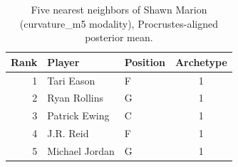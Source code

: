 \begin{table}[htbp]
  \centering\small
  \begin{tabular}{rllc}
    \toprule
    Rank & Player & Position & Archetype \\
    \midrule
    1 & Tari Eason & F & 1 \\
    2 & Ryan Rollins & G & 1 \\
    3 & Patrick Ewing & C & 1 \\
    4 & J.R. Reid & F & 1 \\
    5 & Michael Jordan & G & 1 \\
    \bottomrule
  \end{tabular}
  \caption{Five nearest neighbors of Shawn Marion (curvature_m5 modality), Procrustes-aligned posterior mean.}
  \label{tab:Shawn_Marion_neighbors_curvature_m5}
\end{table}

